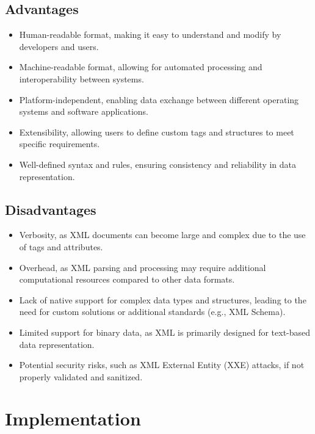 \documentclass[11pt]{article}
\begin{document}
\subsection{Advantages}
\begin{itemize}
    \item Human-readable format, making it easy to understand and modify by developers and users.
    \item Machine-readable format, allowing for automated processing and interoperability between systems.
    \item Platform-independent, enabling data exchange between different operating systems and software applications.
    \item Extensibility, allowing users to define custom tags and structures to meet specific requirements.
    \item Well-defined syntax and rules, ensuring consistency and reliability in data representation.
\end{itemize}

\subsection{Disadvantages}
\begin{itemize}
    \item Verbosity, as XML documents can become large and complex due to the use of tags and attributes.
    \item Overhead, as XML parsing and processing may require additional computational resources compared to other data formats.
    \item Lack of native support for complex data types and structures, leading to the need for custom solutions or additional standards (e.g., XML Schema).
    \item Limited support for binary data, as XML is primarily designed for text-based data representation.
    \item Potential security risks, such as XML External Entity (XXE) attacks, if not properly validated and sanitized.
\end{itemize}


\section{Implementation}
\subsection{}
\end{document}
